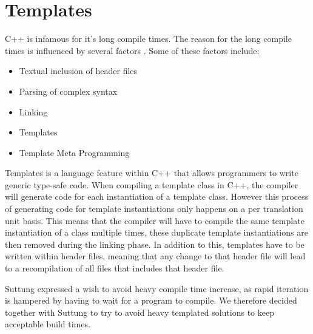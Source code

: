 \section{Templates}
\label{sec:requirements_templates}
C++ is infamous for it's long compile times. The reason for the long compile times is influenced by several factors
\cite{stack_overflow_why_does_cpp_compilation_take_so_long}.
Some of these factors include:
\begin{itemize}
    \item
    Textual inclusion of header files

    \item
    Parsing of complex syntax

    \item
    Linking

    \item
    Templates

    \item
    Template Meta Programming
\end{itemize}

Templates is a language feature within C++ that allows programmers to write generic type-safe code.
When compiling a template class in C++, the compiler will generate code for each instantiation of
a template class.
However this process of generating code for template instantiations only happens on a per translation unit basis.
This means that the compiler will have to compile the same template instantiation of a class multiple times,
these duplicate template instantiations are then removed during the linking phase.
In addition to this, templates have to be written within header files,
meaning that any change to that header file will lead to a recompilation of all files that includes that header file\cite{dr_dobbs_cpp_compilation_speed}.

Suttung expressed a wish to avoid heavy compile time increase, as rapid iteration is hampered by having to wait for a program to compile.
We therefore decided together with Suttung to try to avoid heavy templated solutions to keep acceptable build times.

